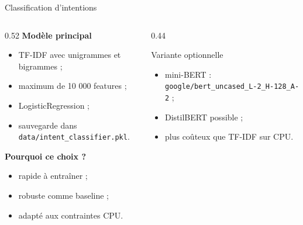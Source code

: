 \documentclass[aspectratio=169,10pt]{beamer}
\begin{document}
\begin{frame}{Classification d'intentions}
    \begin{columns}[T]
        \begin{column}{0.52\textwidth}
            \textbf{Modèle principal}
            \begin{itemize}
                \item TF-IDF avec unigrammes et bigrammes ;
                \item maximum de 10 000 features ;
                \item LogisticRegression ;
                \item sauvegarde dans \texttt{data/intent\_classifier.pkl}.
            \end{itemize}

            \vspace{0.2cm}
            \textbf{Pourquoi ce choix ?}
            \begin{itemize}
                \item rapide à entraîner ;
                \item robuste comme baseline ;
                \item adapté aux contraintes CPU.
            \end{itemize}
        \end{column}
        \begin{column}{0.44\textwidth}
            \begin{block}{Variante optionnelle}
                \begin{itemize}
                    \item mini-BERT : \texttt{google/bert\_uncased\_L-2\_H-128\_A-2} ;
                    \item DistilBERT possible ;
                    \item plus coûteux que TF-IDF sur CPU.
                \end{itemize}
            \end{block}
        \end{column}
    \end{columns}
\end{frame}
\end{document}

